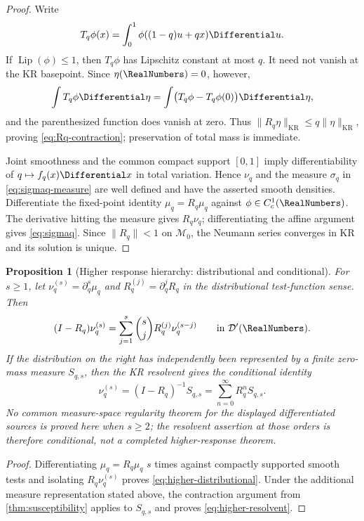 \documentclass[11pt,oneside]{article}
\newtheorem{proposition}[theorem]{Proposition}
\theoremstyle{definition}
\theoremstyle{remark}
\newcommand{\Lip}{\operatorname{Lip}}
\begin{document}
\begin{proof}
Write
\[
 T_q\phi(x)=\int_0^1\phi((1-q)u+qx)\Differential u.
\]
If \(\Lip(\phi)\le1\), then \(T_q\phi\) has Lipschitz constant at most \(q\).
It need not vanish at the KR basepoint.  Since \(\eta(\RealNumbers)=0\), however,
\[
 \int T_q\phi\Differential\eta
 =\int\bigl(T_q\phi-T_q\phi(0)\bigr)\Differential\eta,
\]
and the parenthesized function does vanish at zero.  Thus
\(
\|R_q\eta\|_{\mathrm{KR}}\le q\|\eta\|_{\mathrm{KR}}
\), proving \eqref{eq:Rq-contraction}; preservation of total mass is immediate.

Joint smoothness and the common compact support \([0,1]\) imply differentiability of
\(q\mapsto f_q(x)\Differential x\) in total variation.  Hence \(\nu_q\) and the measure
\(\sigma_q\) in \eqref{eq:sigmaq-measure} are well defined and have the asserted smooth
densities.  Differentiate the fixed-point identity \(\mu_q=R_q\mu_q\) against
\(\phi\in C_c^1(\RealNumbers)\).  The derivative hitting the measure gives \(R_q\nu_q\); differentiating
the affine argument gives \eqref{eq:sigmaq}.  Since \(\|R_q\|<1\) on \(\mathcal M_0\), the
Neumann series converges in KR and its solution is unique.
\end{proof}

\begin{proposition}[Higher response hierarchy: distributional and conditional]
\label{cor:higher-response}
For \(s\ge1\), let \(\nu_q^{(s)}=\partial_q^s\mu_q\) and
\(R_q^{(j)}=\partial_q^jR_q\) in the distributional test-function sense.  Then
\begin{equation}
 (I-R_q)\nu_q^{(s)}
 =\sum_{j=1}^{s}\binom{s}{j}R_q^{(j)}\nu_q^{(s-j)}
 \qquad\text{in }\mathcal D'(\RealNumbers).
 \label{eq:higher-distributional}
\end{equation}
If the distribution on the right has independently been represented by a finite zero-mass
measure \(S_{q,s}\), then the KR resolvent gives the conditional identity
\begin{equation}
 \nu_q^{(s)}=(I-R_q)^{-1}S_{q,s}
 =\sum_{n=0}^{\infty}R_q^nS_{q,s}.
 \label{eq:higher-resolvent}
\end{equation}
No common measure-space regularity theorem for the displayed differentiated sources is proved
here when \(s\ge2\); the resolvent assertion at those orders is therefore conditional, not a
completed higher-response theorem.
\end{proposition}

\begin{proof}
Differentiating \(\mu_q=R_q\mu_q\) \(s\) times against compactly supported smooth tests and
isolating \(R_q\nu_q^{(s)}\) proves \eqref{eq:higher-distributional}.  Under the additional
measure representation stated above, the contraction argument from
\cref{thm:susceptibility} applies to \(S_{q,s}\) and proves \eqref{eq:higher-resolvent}.
\end{proof}
\end{document}
